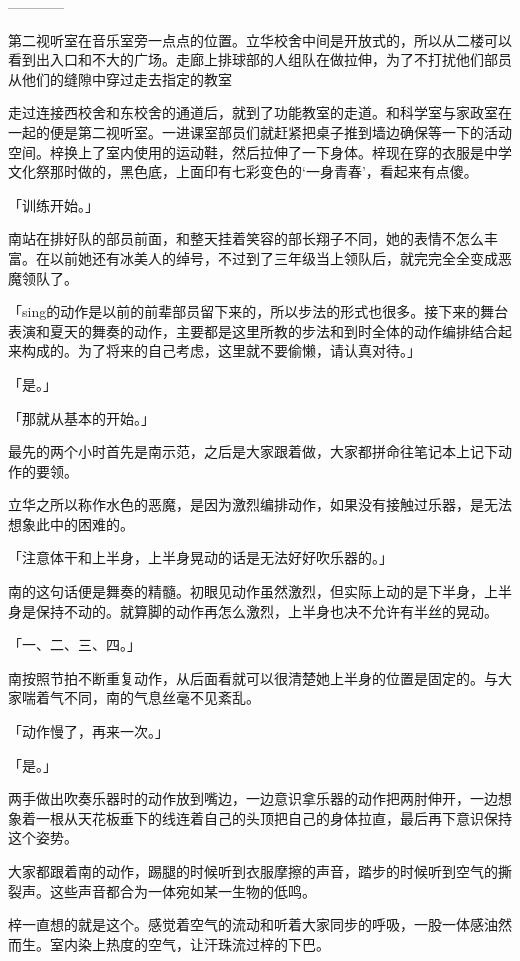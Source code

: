 \documentclass[UTF8]{ctexart}
\begin{document}
    ————

    第二视听室在音乐室旁一点点的位置。立华校舍中间是开放式的，所以从二楼可以看到出入口和不大的广场。走廊上排球部的人组队在做拉伸，为了不打扰他们部员从他们的缝隙中穿过走去指定的教室

    走过连接西校舍和东校舍的通道后，就到了功能教室的走道。和科学室与家政室在一起的便是第二视听室。一进课室部员们就赶紧把桌子推到墙边确保等一下的活动空间。梓换上了室内使用的运动鞋，然后拉伸了一下身体。梓现在穿的衣服是中学文化祭那时做的，黑色底，上面印有七彩变色的‘一身青春’，看起来有点傻。

    「训练开始。」

    南站在排好队的部员前面，和整天挂着笑容的部长翔子不同，她的表情不怎么丰富。在以前她还有冰美人的绰号，不过到了三年级当上领队后，就完完全全变成恶魔领队了。

    「sing的动作是以前的前辈部员留下来的，所以步法的形式也很多。接下来的舞台表演和夏天的舞奏的动作，主要都是这里所教的步法和到时全体的动作编排结合起来构成的。为了将来的自己考虑，这里就不要偷懒，请认真对待。」

    「是。」

    「那就从基本的开始。」

    最先的两个小时首先是南示范，之后是大家跟着做，大家都拼命往笔记本上记下动作的要领。

    立华之所以称作水色的恶魔，是因为激烈编排动作，如果没有接触过乐器，是无法想象此中的困难的。

    「注意体干和上半身，上半身晃动的话是无法好好吹乐器的。」

    南的这句话便是舞奏的精髓。初眼见动作虽然激烈，但实际上动的是下半身，上半身是保持不动的。就算脚的动作再怎么激烈，上半身也决不允许有半丝的晃动。

    「一、二、三、四。」

    南按照节拍不断重复动作，从后面看就可以很清楚她上半身的位置是固定的。与大家喘着气不同，南的气息丝毫不见紊乱。

    「动作慢了，再来一次。」

    「是。」

    两手做出吹奏乐器时的动作放到嘴边，一边意识拿乐器的动作把两肘伸开，一边想象着一根从天花板垂下的线连着自己的头顶把自己的身体拉直，最后再下意识保持这个姿势。

    大家都跟着南的动作，踢腿的时候听到衣服摩擦的声音，踏步的时候听到空气的撕裂声。这些声音都合为一体宛如某一生物的低鸣。

    梓一直想的就是这个。感觉着空气的流动和听着大家同步的呼吸，一股一体感油然而生。室内染上热度的空气，让汗珠流过梓的下巴。
\end{document}
